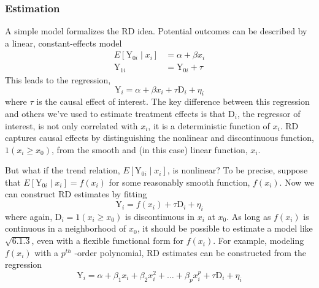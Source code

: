 \documentclass[11pt]{book}%
\begin{document}
\subsubsection{Estimation}
A simple model formalizes the RD idea. Potential outcomes can be described by a linear, constant-effects model
$$
\begin{aligned}
E\left[\mathrm{Y}_{0 i} \mid x_{i}\right] &=\alpha+\beta x_{i} \\
\mathrm{Y}_{1 i} &=\mathrm{Y}_{0 i}+\tau
\end{aligned}
$$
This leads to the regression,
$$
\mathrm{Y}_{i}=\alpha+\beta x_{i}+\tau \mathrm{D}_{i}+\eta_{i}
$$
where $\tau$ is the causal effect of interest. The key difference between this regression and others we've used
to estimate treatment effects  is that $\mathrm{D}_{i}$, the regressor of interest, is not only correlated
with $x_{i}$, it is a deterministic function of $x_{i}$. RD captures causal effects by distinguishing the nonlinear and
discontinuous function, $1\left(x_{i} \geq x_{0}\right)$, from the smooth and (in this case) linear function, $x_{i}$.

But what if the trend relation, $E\left[\mathrm{Y}_{0 i} \mid x_{i}\right]$, is nonlinear? To be precise, suppose that $E\left[\mathrm{Y}_{0 i} \mid x_{i}\right]=f\left(x_{i}\right)$ for
some reasonably smooth function, $f\left(x_{i}\right) .$  Now we can construct RD estimates by fitting
$$
\mathrm{Y}_{i}=f\left(x_{i}\right)+\tau \mathrm{D}_{i}+\eta_{i}
$$
where again, $\mathrm{D}_{i}=1\left(x_{i} \geq x_{0}\right)$ is discontinuous in $x_{i}$ at $x_{0} .$ As long as $f\left(x_{i}\right)$ is continuous in a neighborhood
of $x_{0}$, it should be possible to estimate a model like $\sqrt{6.1 .3}$, even with a flexible functional form for $f\left(x_{i}\right)$. For
example, modeling $f\left(x_{i}\right)$ with a $p^{t h}$ -order polynomial, RD estimates can be constructed from the regression
\begin{equation}\label{s}
\mathrm{Y}_{i}=\alpha+\beta_{1} x_{i}+\beta_{2} x_{i}^{2}+\ldots+\beta_{p} x_{i}^{p}+\tau \mathrm{D}_{i}+\eta_{i}
\end{equation}
\end{document}
